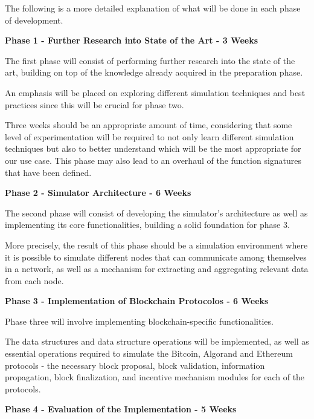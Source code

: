 The following is a more detailed explanation of what will be done in each phase of development.

\newpage

\textbf{Phase 1 - Further Research into State of the Art - 3 Weeks}

The first phase will consist of performing further research into the state of the art, building on top of the knowledge already acquired in the preparation phase.

An emphasis will be placed on exploring different simulation techniques and best practices since this will be crucial for phase two.

Three weeks should be an appropriate amount of time, considering that some level of experimentation will be required to not only learn different simulation techniques but also to better understand which will be the most appropriate for our use case. This phase may also lead to an overhaul of the function signatures that have been defined.

\vspace{0.25cm}

\textbf{Phase 2 - Simulator Architecture - 6 Weeks}

The second phase will consist of developing the simulator's architecture as well as implementing its core functionalities, building a solid foundation for phase 3.

More precisely, the result of this phase should be a simulation environment where it is possible to simulate different nodes that can communicate among themselves in a network, as well as a mechanism for extracting and aggregating relevant data from each node.

\vspace{0.25cm}

\textbf{Phase 3 - Implementation of Blockchain Protocolos - 6 Weeks}

Phase three will involve implementing blockchain-specific functionalities. 

The data structures and data structure operations will be implemented, as well as essential operations required to simulate the Bitcoin, Algorand and Ethereum protocols - the necessary block proposal, block validation, information propagation, block finalization, and incentive mechanism modules for each of the protocols.

\vspace{0.25cm}

\textbf{Phase 4 - Evaluation of the Implementation - 5 Weeks}

